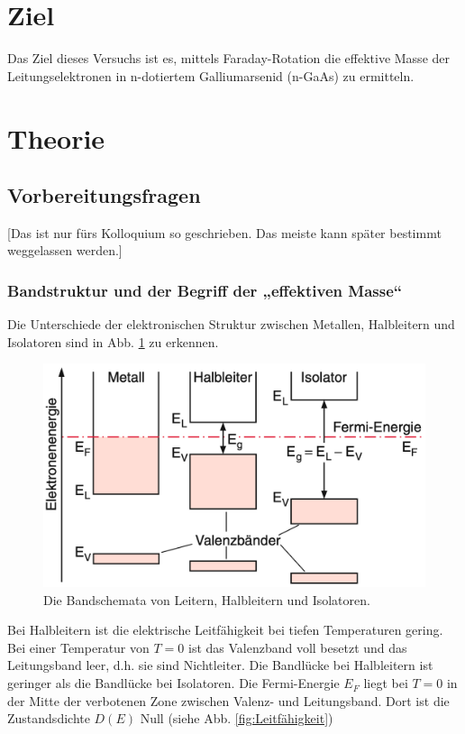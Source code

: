 \section{Ziel}
Das Ziel dieses Versuchs ist es, mittels Faraday-Rotation die effektive Masse der Leitungselektronen in n-dotiertem Galliumarsenid (n-GaAs) zu ermitteln.

\section{Theorie}
\label{sec:Theorie}

\subsection{Vorbereitungsfragen}
[Das ist nur fürs Kolloquium so geschrieben. Das meiste kann später bestimmt weggelassen werden.]

\subsubsection{Bandstruktur und der Begriff der „effektiven Masse“}
Die Unterschiede der elektronischen Struktur zwischen Metallen, Halbleitern und Isolatoren sind in Abb. \ref{fig:Bandschemata} zu erkennen.
\begin{figure}
    \centering
    \includegraphics[width=12cm]{fotos/Bandschemata.png}
    \caption{Die Bandschemata von Leitern, Halbleitern und Isolatoren. \cite{demtroeder}}
    \label{fig:Bandschemata}
\end{figure}
Bei Halbleitern ist die elektrische Leitfähigkeit bei tiefen Temperaturen gering. Bei einer Temperatur von $T = \num{0}$ ist das Valenzband voll besetzt und das Leitungsband leer, d.h. sie sind Nichtleiter. Die Bandlücke bei Halbleitern ist geringer als die Bandlücke bei Isolatoren. \cite{demtroeder}
Die Fermi-Energie $E_F$ liegt bei $T = \num{0}$ in der Mitte der verbotenen Zone zwischen Valenz- und Leitungsband. Dort ist die Zustandsdichte $D(E)$ Null (siehe Abb. \ref{fig:Leitfähigkeit})

